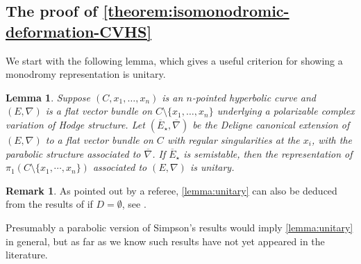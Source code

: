 \documentclass[12 pt]{amsart}
\theoremstyle{plain}
\newtheorem{lemma}[subsubsection]{Lemma}
\theoremstyle{definition}
\newtheorem{remark}[subsubsection]{Remark}
\theoremstyle{remark}
\numberwithin{equation}{section}
\begin{document}
\subsection{The proof of \autoref{theorem:isomonodromic-deformation-CVHS}}
\label{subsection:iso-def-proof}
We start with the following lemma, which gives a useful criterion for showing a
monodromy representation is unitary.
\begin{lemma}
	\label{lemma:unitary}
	Suppose $(C, x_1, \ldots, x_n)$ is an $n$-pointed hyperbolic curve and $(E,
	\nabla)$ is a flat vector bundle on $C\setminus\{ x_1, \ldots, x_n\}$
	underlying a polarizable complex variation of Hodge structure. Let
	$(\overline{E}_\star, \overline{\nabla})$ be the Deligne canonical extension of $(E, \nabla)$ to a flat vector bundle on $C$ with regular singularities at the $x_i$, with the parabolic structure associated to $\overline{\nabla}$.
	If $\overline{E}_\star$ is semistable, then the representation of $\pi_1(C\setminus\{x_1, \cdots, x_n\})$ 
	associated to $(E, \nabla)$ is unitary.
\end{lemma}
\begin{remark}
	\label{remark:simpson-reference}
	As pointed out by a referee, \autoref{lemma:unitary} can also be deduced from the results of
	\cite{simpson:iterated-destabilizing-modifications} if $D=\emptyset$, see \cite[\S5.4]{simpson:iterated-destabilizing-modifications}. 
	 
	Presumably a parabolic version of Simpson's results would imply  \autoref{lemma:unitary} in general, but as far as we know such results have not yet appeared in the literature. 
\end{remark}
\end{document}
